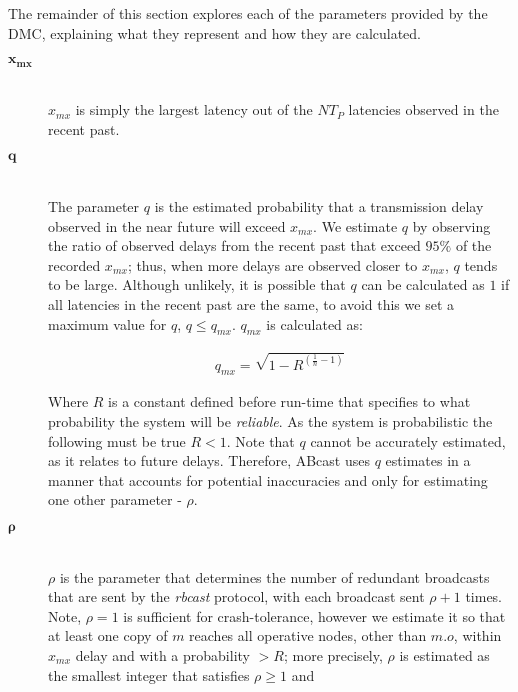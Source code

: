         The remainder of this section explores each of the parameters provided by the DMC, explaining what they represent and how they are calculated.  
        
        \begin{description}
        \item[\Huge$\boldsymbol{x_{mx}}$] \hfill \\
        $x_{mx}$ is simply the largest latency out of the $NT_P$ latencies observed in the recent past.  
        
        \item[\Huge$\boldsymbol{q}$] \hfill \\
                The parameter $q$ is the estimated probability that a transmission delay observed in the near future will exceed $x_{mx}$.  We estimate $q$ by observing the ratio of observed delays from the recent past that exceed $95\%$ of the recorded $x_{mx}$; thus, when more delays are observed closer to $x_{mx}$, $q$ tends to be large.  Although unlikely, it is possible that $q$ can be calculated as $1$ if all latencies in the recent past are the same, to avoid this we set a maximum value for $q$, $ q \leq q_{mx}$.  $q_{mx}$ is calculated as: 

        \begin{equation*}
		     \begin{aligned}
		          q_{mx} = \sqrt{1 - R^{(\frac{1}{n} - 1)}}
		     \end{aligned}
        \end{equation*}
        
        Where $R$ is a constant defined before run-time that specifies to what probability the system will be \emph{reliable}.  As the system is probabilistic the following must be true $R < 1$.  Note that $q$ cannot be accurately estimated, as it relates to future delays.  Therefore, \textsf{ABcast} uses $q$ estimates in a manner that accounts for potential inaccuracies and only for estimating one other parameter - $\rho$.
	
	    \item[\Huge$\boldsymbol{\rho}$] \hfill \\
	    $\rho$ is the parameter that determines the number of redundant broadcasts that are sent by the \emph{rbcast} protocol, with each broadcast sent $\rho + 1$ times.  Note, $\rho = 1$ is sufficient for crash-tolerance, however we estimate it so that at least one copy of $m$ reaches all operative nodes, other than $m.o$, within $x_{mx}$ delay and with a probability $> R$; more precisely, $\rho$ is estimated as the smallest integer that satisfies $\rho \geq 1$ and


\end{description}

